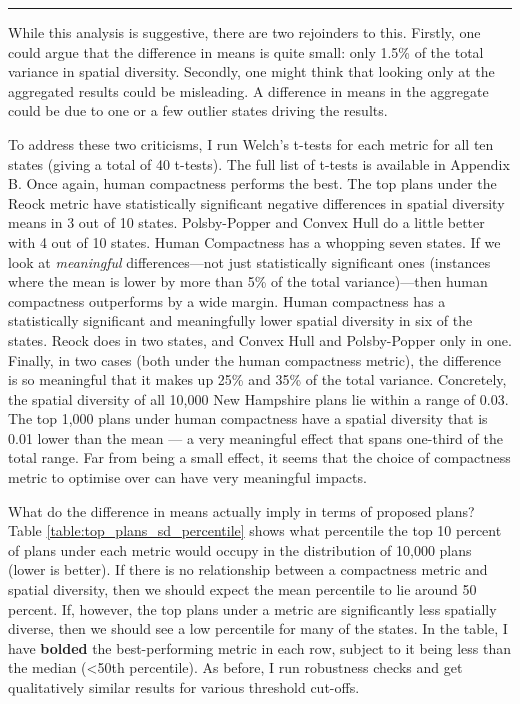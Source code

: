 \documentclass[]{article}
\begin{document}
\begin{center}\rule{0.5\linewidth}{\linethickness}\end{center}

While this analysis is suggestive, there are two rejoinders to this.
Firstly, one could argue that the difference in means is quite small:
only 1.5\% of the total variance in spatial diversity. Secondly, one
might think that looking only at the aggregated results could be
misleading. A difference in means in the aggregate could be due to one
or a few outlier states driving the results.

To address these two criticisms, I run Welch's t-tests for each metric
for all ten states (giving a total of 40 t-tests). The full list of
t-tests is available in Appendix B. Once again, human compactness
performs the best. The top plans under the Reock metric have
statistically significant negative differences in spatial diversity
means in 3 out of 10 states. Polsby-Popper and Convex Hull do a little
better with 4 out of 10 states. Human Compactness has a whopping seven
states. If we look at \emph{meaningful} differences---not just
statistically significant ones (instances where the mean is lower by
more than 5\% of the total variance)---then human compactness
outperforms by a wide margin. Human compactness has a statistically
significant and meaningfully lower spatial diversity in six of the
states. Reock does in two states, and Convex Hull and Polsby-Popper only
in one. Finally, in two cases (both under the human compactness metric),
the difference is so meaningful that it makes up 25\% and 35\% of the
total variance. Concretely, the spatial diversity of all 10,000 New
Hampshire plans lie within a range of 0.03. The top 1,000 plans under
human compactness have a spatial diversity that is 0.01 lower than the
mean --- a very meaningful effect that spans one-third of the total
range. Far from being a small effect, it seems that the choice of
compactness metric to optimise over can have very meaningful impacts.

What do the difference in means actually imply in terms of proposed
plans? Table \ref{table:top_plans_sd_percentile} shows what percentile
the top 10 percent of plans under each metric would occupy in the
distribution of 10,000 plans (lower is better). If there is no
relationship between a compactness metric and spatial diversity, then we
should expect the mean percentile to lie around 50 percent. If, however,
the top plans under a metric are significantly less spatially diverse,
then we should see a low percentile for many of the states. In the
table, I have \textbf{bolded} the best-performing metric in each row,
subject to it being less than the median (\textless{}50th percentile).
As before, I run robustness checks and get qualitatively similar results
for various threshold cut-offs.
\end{document}
